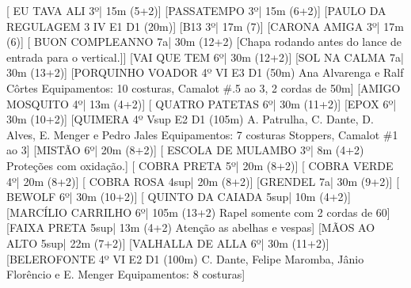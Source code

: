 
\begin{CGSectorRoutes}
    [ EU TAVA ALI 3º| 15m (5+2)]
    [PASSATEMPO 3º| 15m (6+2)]
    [PAULO DA REGULAGEM 3 IV E1 D1 (20m)]
    [B13 3º| 17m (7)]
    [CARONA AMIGA 3º| 17m (6)]
    [ BUON COMPLEANNO 7a| 30m (12+2) [Chapa rodando antes do lance de entrada para o vertical.]]
    [VAI QUE TEM 6º| 30m (12+2)]
    [SOL NA CALMA 7a| 30m (13+2)]
    [PORQUINHO VOADOR 4º VI E3 D1 (50m) Ana Alvarenga e Ralf Côrtes Equipamentos: 10 costuras, Camalot \#.5 ao 3, 2 cordas de 50m]
    [AMIGO MOSQUITO 4º| 13m (4+2)]
    [ QUATRO PATETAS 6º| 30m (11+2)]
    [EPOX 6º| 30m (10+2)]
    [QUIMERA 4º Vsup E2 D1 (105m) A. Patrulha, C. Dante, D. Alves, E. Menger e Pedro Jales Equipamentos: 7 costuras
Stoppers, Camalot \#1 ao 3]
    [MISTÃO 6º| 20m (8+2)]
    [ ESCOLA DE MULAMBO 3º| 8m (4+2) Proteções com oxidação.]
    [ COBRA PRETA 5º| 20m (8+2)]
    [ COBRA VERDE 4º| 20m (8+2)]
    [ COBRA ROSA 4sup| 20m (8+2)]
    [GRENDEL 7a| 30m (9+2)]
    [ BEWOLF 6º| 30m (10+2)]
    [ QUINTO DA CAIADA 5sup| 10m (4+2)]
    [MARCÍLIO CARRILHO 6º| 105m (13+2) Rapel somente com 2 cordas de 60]
    [FAIXA PRETA 5sup| 13m (4+2) Atenção as abelhas e vespas]
    [MÃOS AO ALTO 5sup| 22m (7+2)]
    [VALHALLA DE ALLA 6º| 30m (11+2)]
    [BELEROFONTE 4º VI E2 D1 (100m) C. Dante, Felipe Maromba, Jânio Florêncio e E. Menger Equipamentos: 8 costuras]

\end{CGSectorRoutes}

